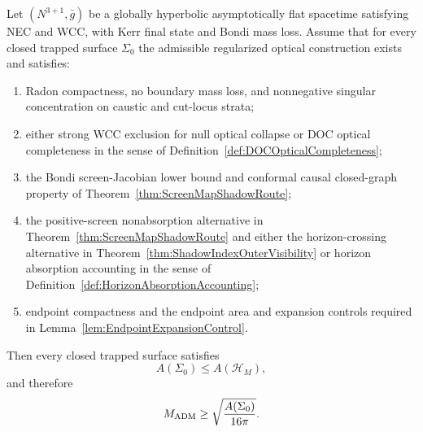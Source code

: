 \begin{theorem}\label{thm:ScreenMapPenroseRoute}
Let $(N^{3+1},\bar g)$ be a globally hyperbolic asymptotically flat spacetime satisfying NEC and WCC, with Kerr final state and Bondi mass loss. Assume that for every closed trapped surface $\Sigma_0$ the admissible regularized optical construction exists and satisfies:
\begin{enumerate}
    \item Radon compactness, no boundary mass loss, and nonnegative singular concentration on caustic and cut-locus strata;
    \item either strong WCC exclusion for null optical collapse or DOC optical completeness in the sense of Definition~\ref{def:DOCOpticalCompleteness};
    \item the Bondi screen-Jacobian lower bound and conformal causal closed-graph property of Theorem~\ref{thm:ScreenMapShadowRoute};
    \item the positive-screen nonabsorption alternative in Theorem~\ref{thm:ScreenMapShadowRoute} and either the horizon-crossing alternative in Theorem~\ref{thm:ShadowIndexOuterVisibility} or horizon absorption accounting in the sense of Definition~\ref{def:HorizonAbsorptionAccounting};
    \item endpoint compactness and the endpoint area and expansion controls required in Lemma~\ref{lem:EndpointExpansionControl}.
\end{enumerate}
Then every closed trapped surface satisfies
\[
    A(\Sigma_0)\le A(\mathcal H_M),
\]
and therefore
\[
    M_{\mathrm{ADM}}\ge \sqrt{\frac{A(\Sigma_0)}{16\pi}} .
\]
\end{theorem}

